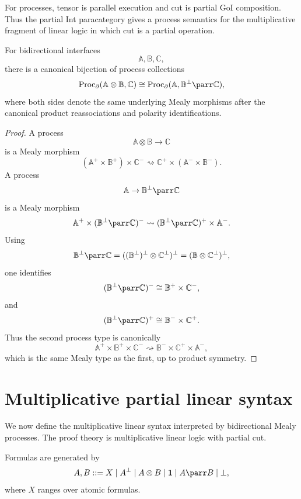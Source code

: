 For processes, tensor is parallel execution and cut is partial GoI
composition.  Thus the partial Int paracategory gives a process semantics for
the multiplicative fragment of linear logic in which cut is a partial
operation.

\begin{proposition}
\label{prop:bidirectional-currying}
For bidirectional interfaces
\[
\mathbb A,\mathbb B,\mathbb C,
\]
there is a canonical bijection of process collections
\[
\operatorname{Proc}_{\partial}(\mathbb A\otimes\mathbb B,\mathbb C)
\cong
\operatorname{Proc}_{\partial}(\mathbb A,\mathbb B^\bot\parr\mathbb C),
\]
where both sides denote the same underlying Mealy morphisms after the
canonical product reassociations and polarity identifications.
\end{proposition}

\begin{proof}
A process
\[
\mathbb A\otimes\mathbb B\to\mathbb C
\]
is a Mealy morphism
\[
(\mathbb A^+\times\mathbb B^+)\times\mathbb C^-
\rightsquigarrow
\mathbb C^+\times(\mathbb A^-\times\mathbb B^-).
\]
A process
\[
\mathbb A\to\mathbb B^\bot\parr\mathbb C
\]
is a Mealy morphism
\[
\mathbb A^+\times(\mathbb B^\bot\parr\mathbb C)^-
\rightsquigarrow
(\mathbb B^\bot\parr\mathbb C)^+\times\mathbb A^-.
\]
Using
\[
\mathbb B^\bot\parr\mathbb C
=
((\mathbb B^\bot)^\bot\otimes\mathbb C^\bot)^\bot
=
(\mathbb B\otimes\mathbb C^\bot)^\bot,
\]
one identifies
\[
(\mathbb B^\bot\parr\mathbb C)^-
\cong
\mathbb B^+\times\mathbb C^-,
\]
and
\[
(\mathbb B^\bot\parr\mathbb C)^+
\cong
\mathbb B^-\times\mathbb C^+.
\]
Thus the second process type is canonically
\[
\mathbb A^+\times\mathbb B^+\times\mathbb C^-
\rightsquigarrow
\mathbb B^-\times\mathbb C^+\times\mathbb A^-,
\]
which is the same Mealy type as the first, up to product symmetry.
\end{proof}

\section{Multiplicative partial linear syntax}
\label{sec:multiplicative-partial-linear-syntax}

We now define the multiplicative linear syntax interpreted by bidirectional
Mealy processes.  The proof theory is multiplicative linear logic with partial
cut.

\begin{definition}[Formulas]
\label{def:mll-formulas}
Formulas are generated by
\[
A,B
::=
X
\mid
A^\bot
\mid
A\otimes B
\mid
\mathbf 1
\mid
A\parr B
\mid
\bot,
\]
where \(X\) ranges over atomic formulas.
\end{definition}

